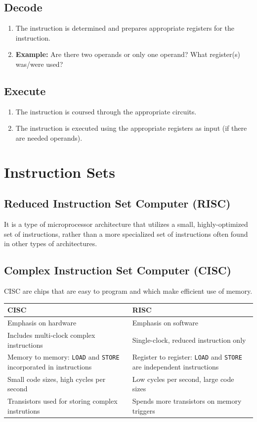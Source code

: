 \documentclass[9pt,twocolumn]{article}
\begin{document}
  \subsection*{Decode}
    \begin{enumerate}
      \item The instruction is determined and prepares appropriate registers for the instruction.
      \item \textbf{Example:} Are there two operands or only one operand? What register(s) was/were used?
    \end{enumerate}

  \subsection*{Execute}
    \begin{enumerate}
      \item The instruction is coursed through the appropriate circuits.
      \item The instruction is executed using the appropriate registers as input (if there are needed operands).
    \end{enumerate}

\section*{Instruction Sets}
  \subsection*{Reduced Instruction Set Computer (RISC)}
    It is a type of microprocessor architecture that utilizes a small, highly-optimized set of instructions, rather than a more specialized set of instructions often found in other types of architectures.

  \subsection*{Complex Instruction Set Computer (CISC)}
    CISC are chips that are easy to program and which make efficient use of memory.

  \begin{table}[h]
    \centering
    \begin{tabular}{p{4cm} | p{4cm}}
      \textbf{CISC} & \textbf{RISC} \\
      \hline
      Emphasis on hardware & Emphasis on software \\
      Includes multi-clock complex instructions & Single-clock, reduced instruction only \\
      Memory to memory: \texttt{LOAD} and \texttt{STORE} incorporated in instructions & Register to register: \texttt{LOAD} and \texttt{STORE} are independent instructions \\
      Small code sizes, high cycles per second & Low cycles per second, large code sizes \\
      Transistors used for storing complex instrutions & Spends more transistors on memory triggers
    \end{tabular}
  \end{table}
\end{document}
